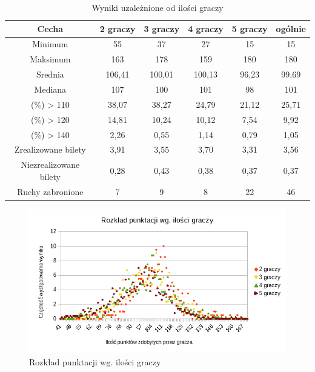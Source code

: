 \documentclass[12pt, oneside]{report}
\begin{document}
\begin{table}[h]
	\begin{center}
		\begin{tabular}{| c | c | c | c | c | c |} \hline
			Cecha & 2 graczy & 3 graczy & 4 graczy & 5 graczy & ogólnie \\ \hline
			Minimum & 55 & 37 & 27 & 15 & 15 \\ \hline
			Maksimum & 163 & 178 & 159 & 180 & 180 \\ \hline
			Srednia & 106,41 & 100,01 & 100,13 & 96,23 & 99,69 \\ \hline
			Mediana & 107 & 100 & 101 & 98 & 101 \\ \hline
			(\%) > 110 & 38,07 & 38,27 & 24,79 & 21,12 & 25,71 \\ \hline
			(\%) > 120 & 14,81 & 10,24 & 10,12 & 7,54 & 9,92 \\ \hline
			(\%) > 140 & 2,26 & 0,55 & 1,14 & 0,79 & 1,05 \\ \hline
			Zrealizowane bilety & 3,91 & 3,55 & 3,70 & 3,31 & 3,56 \\ \hline
			Niezrealizowane bilety & 0,28 & 0,43 & 0,38 & 0,37 & 0,37 \\ \hline
			Ruchy zabronione & 7&9&8&22&46 \\ \hline
		\end{tabular}
		\caption{Wyniki uzależnione od ilości graczy}
		\label{table:nn_sizeresult}
	\end{center}
\end{table}

\begin{figure}[h]
	\includegraphics{NNWykrespunktow.png}
	\caption{Rozkład punktacji wg. ilości graczy}
	\label{figure:player_points_nn}
\end{figure}
\end{document}
